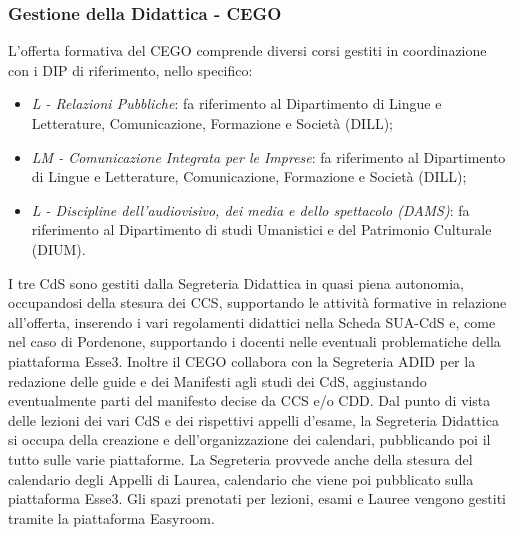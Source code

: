        \subsubsection{Gestione della Didattica - CEGO}
           L'offerta formativa del CEGO comprende diversi corsi gestiti in coordinazione con i DIP di riferimento, nello specifico: 
            \begin{itemize}
                \item \textsl{L - Relazioni Pubbliche}: fa riferimento al Dipartimento di Lingue e Letterature, Comunicazione, Formazione e Società (DILL);
                \item \textsl{LM - Comunicazione Integrata per le Imprese}: fa riferimento al Dipartimento di Lingue e Letterature, Comunicazione, Formazione e Società (DILL);
                \item \textsl{L - Discipline dell'audiovisivo, dei media e dello spettacolo (DAMS)}: fa riferimento al Dipartimento di studi Umanistici e del Patrimonio Culturale (DIUM).
            \end{itemize}
            I tre CdS sono gestiti dalla Segreteria Didattica in quasi piena autonomia, occupandosi della stesura dei CCS, supportando le attività formative in relazione all'offerta, inserendo i vari regolamenti didattici nella Scheda SUA-CdS e, come nel caso di Pordenone, supportando i docenti nelle eventuali problematiche della piattaforma Esse3. Inoltre il CEGO collabora con la Segreteria ADID per la redazione delle guide e dei Manifesti agli studi dei CdS, aggiustando eventualmente parti del manifesto decise da CCS e/o CDD. \newline
            Dal punto di vista delle lezioni dei vari CdS e dei rispettivi appelli d'esame, la Segreteria Didattica si occupa della creazione e dell'organizzazione dei calendari, pubblicando poi il tutto sulle varie piattaforme. La Segreteria provvede anche della stesura del calendario degli Appelli di Laurea, calendario che viene poi pubblicato sulla piattaforma Esse3. Gli spazi prenotati per lezioni, esami e Lauree vengono gestiti tramite la piattaforma Easyroom. 
